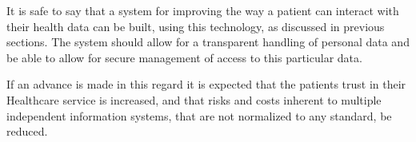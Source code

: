 \documentclass[]{llncs}
\begin{document}
It is safe to say that a system for improving the way a patient can interact with their health data 
can be built, using this technology, as discussed in previous sections. 
The system should allow for a transparent handling of personal data and be able to allow for secure 
management of access to this particular data.

If an advance is made in this regard it is expected that the patients trust in their Healthcare service 
is increased, and that risks and costs inherent to multiple independent information systems, that are 
not normalized to any standard, be reduced. 


\begingroup
\nocite{*}
\raggedright


\endgroup
\end{document}
